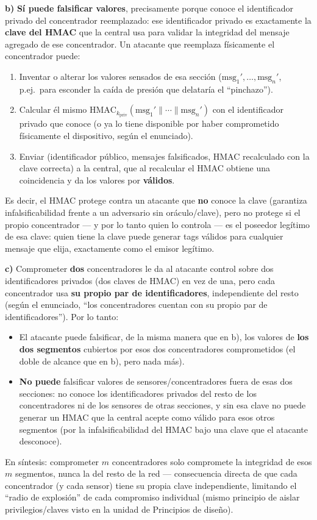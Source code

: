 \textbf{b)} \textbf{Sí puede falsificar valores}, precisamente porque conoce el
identificador privado del concentrador reemplazado: ese identificador privado es
exactamente la \textbf{clave del HMAC} que la central usa para validar la integridad
del mensaje agregado de ese concentrador. Un atacante que reemplaza físicamente el
concentrador puede:
\begin{enumerate}
  \item Inventar o alterar los valores sensados de esa sección ($\text{msg}_1', \ldots,
  \text{msg}_n'$, p.ej.\ para esconder la caída de presión que delataría el
  ``pinchazo'').
  \item Calcular él mismo $\mathrm{HMAC}_{k_{\text{priv}}}(\text{msg}_1'\|\cdots\|
  \text{msg}_n')$ con el identificador privado que conoce (o ya lo tiene disponible por
  haber comprometido físicamente el dispositivo, según el enunciado).
  \item Enviar (identificador público, mensajes falsificados, HMAC recalculado con la
  clave correcta) a la central, que al recalcular el HMAC obtiene una coincidencia y da
  los valores por \textbf{válidos}.
\end{enumerate}
Es decir, el HMAC protege contra un atacante que \textbf{no} conoce la clave (garantiza
infalsificabilidad frente a un adversario sin oráculo/clave), pero no protege si el
propio concentrador --- y por lo tanto quien lo controla --- es el poseedor legítimo de
esa clave: quien tiene la clave puede generar tags válidos para cualquier mensaje que
elija, exactamente como el emisor legítimo.

\textbf{c)} Comprometer \textbf{dos} concentradores le da al atacante control sobre dos
identificadores privados (dos claves de HMAC) en vez de una, pero cada concentrador
usa \textbf{su propio par de identificadores}, independiente del resto (según el
enunciado, ``los concentradores cuentan con su propio par de identificadores''). Por lo
tanto:
\begin{itemize}
  \item El atacante puede falsificar, de la misma manera que en b), los valores de
  \textbf{los dos segmentos} cubiertos por esos dos concentradores comprometidos (el
  doble de alcance que en b), pero nada más).
  \item \textbf{No puede} falsificar valores de sensores/concentradores fuera de esas
  dos secciones: no conoce los identificadores privados del resto de los
  concentradores ni de los sensores de otras secciones, y sin esa clave no puede
  generar un HMAC que la central acepte como válido para esos otros segmentos (por la
  infalsificabilidad del HMAC bajo una clave que el atacante desconoce).
\end{itemize}
En síntesis: comprometer $m$ concentradores solo compromete la integridad de esos $m$
segmentos, nunca la del resto de la red --- consecuencia directa de que cada
concentrador (y cada sensor) tiene su propia clave independiente, limitando el
``radio de explosión'' de cada compromiso individual (mismo principio de aislar
privilegios/claves visto en la unidad de Principios de diseño).

